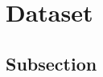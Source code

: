 \section{Dataset}
\label{sec:dataset}
\lipsum[8]

\subsection{Subsection}
\label{sec:dataset:subsection}
\lipsum[8]